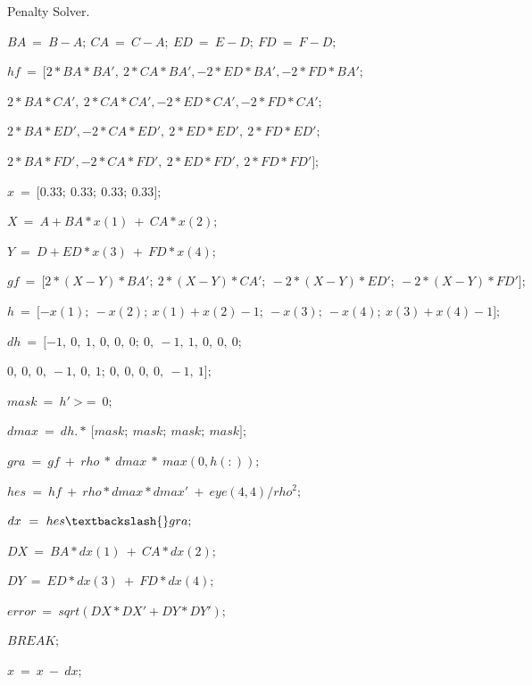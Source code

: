 \begin{algorithm}
	\caption{Penalty Solver.}
 	\label{algorithm:penalty}
	\begin{algorithmic}[1]
	

		\State $BA~=~B-A;~CA~=~C-A;~ED~=~E-D;~FD~=~F-D;$

		\State $hf~=~{[}2{*}BA{*}BA',~2{*}CA{*}BA',-2{*}ED{*}BA',-2{*}FD{*}BA';$

		\State $2{*}BA{*}CA',~2{*}CA{*}CA',-2{*}ED{*}CA',-2{*}FD{*}CA';$

		\State $2{*}BA{*}ED',-2{*}CA{*}ED',~2{*}ED{*}ED',~2{*}FD{*}ED';$

		\State $2{*}BA{*}FD',-2{*}CA{*}FD',~2{*}ED{*}FD',~2{*}FD{*}FD'{]};$

		\State $x~=~{[}0.33;~0.33;~0.33;~0.33{]};$


			\State $X~=~A+BA{*}x(1)~+~CA{*}x(2);$

			\State $Y~=~D+ED{*}x(3)~+~FD{*}x(4);$

			\State $gf~=~{[}2{*}(X-Y){*}BA';~2{*}(X-Y){*}CA';~-2{*}(X-Y){*}ED';~-2{*}(X-Y){*}FD'{]};$

			\State $h~=~{[}-x(1);~-x(2);~x(1)+x(2)-1;~-x(3);~-x(4);~x(3)+x(4)-1{]};$

			\State $dh~=~{[}-1,~0,~1,~0,~0,~0;~0,~-1,~1,~0,~0,~0;$

			\State $0,~0,~0,~-1,~0,~1;~0,~0,~0,~0,~-1,~1{]};$

			\State $mask~=~h'~$>$=~0;$

			\State $dmax~=~dh.{*}~{[}mask;~mask;~mask;~mask{]};$

			\State $gra~=~gf~+~rho~{*}~dmax~{*}~max(0,h(:));$

			\State $hes~=~hf~+~rho{*}dmax{*}dmax'~+~eye(4,4)/rho^2;$

			\State $dx~=~hes\textbackslash{}gra;$

			\State $DX~=~BA{*}dx(1)~+~CA{*}dx(2);$

			\State $DY~=~ED{*}dx(3)~+~FD{*}dx(4);$

			\State $error~=~sqrt(DX{*}DX'+DY{*}DY');$

				\State $BREAK;$
			\EndIf

			\State $x~=~x~-~dx;$

		\EndFor

	\EndFunction
	\end{algorithmic}
\end{algorithm}

